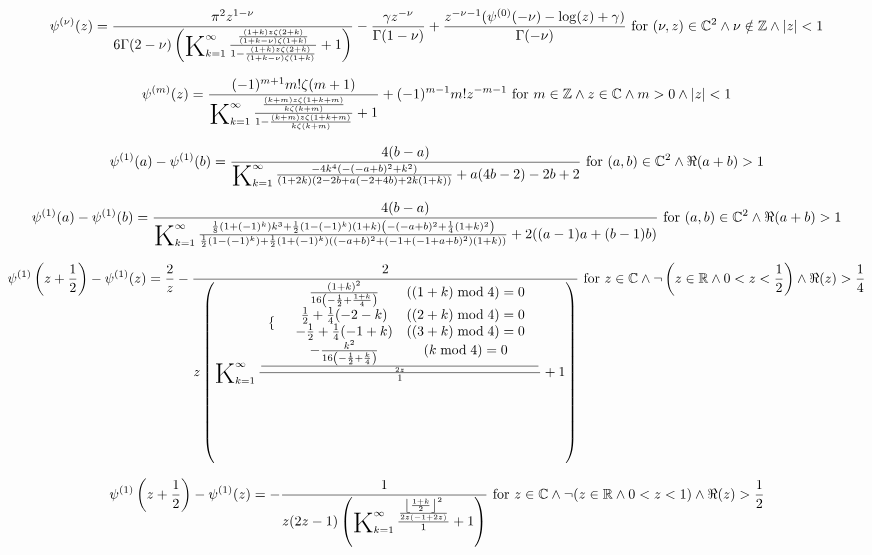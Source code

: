 \documentclass{article}
\newcommand{\bigK}{\mathop{\raisebox{-5pt}{\huge K}}}
\begin{document}
\[\psi ^{(\nu )}(z)=\frac{\pi ^2 z^{1-\nu }}{6 \Gamma (2-\nu ) \left(\bigK_{k=1}^{\infty}\frac{\frac{(1+k) z \zeta (2+k)}{(1+k-\nu ) \zeta (1+k)}}{1-\frac{(1+k) z \zeta (2+k)}{(1+k-\nu ) \zeta (1+k)}}+1\right)}-\frac{\gamma  z^{-\nu }}{\Gamma (1-\nu )}+\frac{z^{-\nu -1} (\psi ^{(0)}(-\nu )-\log (z)+\gamma )}{\Gamma (-\nu )}\text{ for }(\nu ,z)\in \mathbb{C}^2\land \nu \notin \mathbb{Z}\land \left| z\right| <1\] 

\[\psi ^{(m)}(z)=\frac{(-1)^{m+1} m! \zeta (m+1)}{\bigK_{k=1}^{\infty}\frac{\frac{(k+m) z \zeta (1+k+m)}{k \zeta (k+m)}}{1-\frac{(k+m) z \zeta (1+k+m)}{k \zeta (k+m)}}+1}+(-1)^{m-1} m! z^{-m-1}\text{ for }m\in \mathbb{Z}\land z\in \mathbb{C}\land m>0\land \left| z\right| <1\] 

\[\psi ^{(1)}(a)-\psi ^{(1)}(b)=\frac{4 (b-a)}{\bigK_{k=1}^{\infty}\frac{-4 k^4 \left(-(-a+b)^2+k^2\right)}{(1+2 k) (2-2 b+a (-2+4 b)+2 k (1+k))}+a (4 b-2)-2 b+2}\text{ for }(a,b)\in \mathbb{C}^2\land \Re(a+b)>1\] 

\[\psi ^{(1)}(a)-\psi ^{(1)}(b)=\frac{4 (b-a)}{\bigK_{k=1}^{\infty}\frac{\frac{1}{8} \left(1+(-1)^k\right) k^3+\frac{1}{2} \left(1-(-1)^k\right) (1+k) \left(-(-a+b)^2+\frac{1}{4} (1+k)^2\right)}{\frac{1}{2} \left(1-(-1)^k\right)+\frac{1}{2} \left(1+(-1)^k\right) \left((-a+b)^2+\left(-1+(-1+a+b)^2\right) (1+k)\right)}+2 ((a-1) a+(b-1) b)}\text{ for }(a,b)\in \mathbb{C}^2\land \Re(a+b)>1\] 

\[\psi ^{(1)}\left(z+\frac{1}{2}\right)-\psi ^{(1)}(z)=\frac{2}{z}-\frac{2}{z \left(\bigK_{k=1}^{\infty}\frac{\frac{ \begin{array}{cc}  \{ &  \begin{array}{cc}  \frac{(1+k)^2}{16 \left(-\frac{1}{2}+\frac{1+k}{4}\right)} & ((1+k) \bmod 4)=0 \\  \frac{1}{2}+\frac{1}{4} (-2-k) & ((2+k) \bmod 4)=0 \\  -\frac{1}{2}+\frac{1}{4} (-1+k) & ((3+k) \bmod 4)=0 \\  -\frac{k^2}{16 \left(-\frac{1}{2}+\frac{k}{4}\right)} & (k \bmod 4)=0 \\ \end{array}  \\ \end{array} }{2 z}}{1}+1\right)}\text{ for }z\in \mathbb{C}\land \neg \left(z\in \mathbb{R}\land 0<z<\frac{1}{2}\right)\land \Re(z)>\frac{1}{4}\] 

\[\psi ^{(1)}\left(z+\frac{1}{2}\right)-\psi ^{(1)}(z)=-\frac{1}{z (2 z-1) \left(\bigK_{k=1}^{\infty}\frac{\frac{\left\lfloor \frac{1+k}{2}\right\rfloor ^2}{2 z (-1+2 z)}}{1}+1\right)}\text{ for }z\in \mathbb{C}\land \neg (z\in \mathbb{R}\land 0<z<1)\land \Re(z)>\frac{1}{2}\] 
\end{document}
